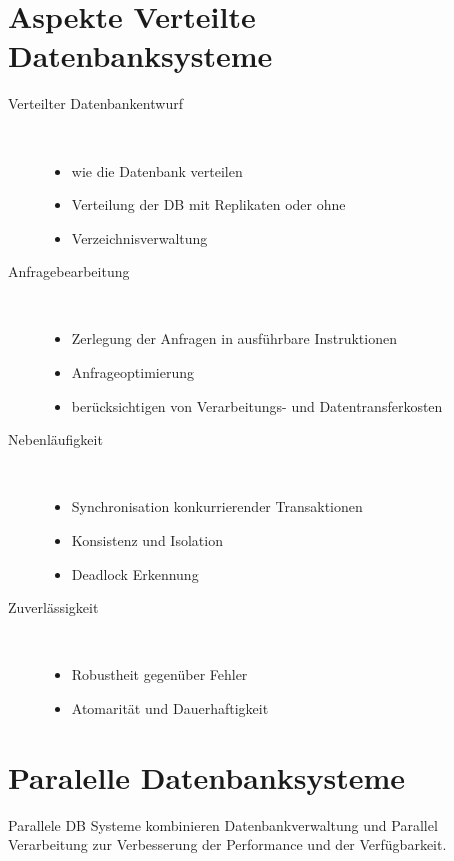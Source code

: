\documentclass[a4paper,10pt,titlepage=false]{scrreprt}
\begin{document}
\section{Aspekte Verteilte Datenbanksysteme}
\begin{description}
 \item [Verteilter Datenbankentwurf]\hfill \\ \begin{itemize}
                                      \item wie die Datenbank verteilen
\item Verteilung der DB mit Replikaten oder ohne
\item Verzeichnisverwaltung
                                     \end{itemize}
\item[Anfragebearbeitung] \hfill \\ \begin{itemize}
                           \item Zerlegung der Anfragen in ausführbare Instruktionen
\item Anfrageoptimierung
\item berücksichtigen von Verarbeitungs- und
Datentransferkosten
                          \end{itemize}
\item[Nebenläufigkeit] \hfill \\ \begin{itemize}
                        \item Synchronisation konkurrierender Transaktionen
\item Konsistenz und Isolation
\item Deadlock Erkennung
                       \end{itemize}
\item[Zuverlässigkeit] \hfill \\\begin{itemize}
                        \item Robustheit gegenüber Fehler
\item Atomarität und Dauerhaftigkeit
                       \end{itemize}


\end{description}

\section{Paralelle Datenbanksysteme}
Parallele DB Systeme kombinieren
Datenbankverwaltung und
Parallel Verarbeitung zur
Verbesserung der Performance und der Verfügbarkeit.
\end{document}
